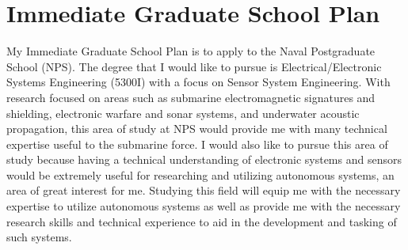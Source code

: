 \documentclass[10pt]{article}
\begin{document}
\section{Immediate Graduate School Plan}
My Immediate Graduate School Plan is to apply to the Naval Postgraduate School (NPS). The degree that I would like to pursue is Electrical/Electronic Systems Engineering (5300I) with a focus on  Sensor System Engineering. With research focused on areas such as submarine electromagnetic signatures and shielding, electronic warfare and sonar systems, and underwater acoustic propagation, this area of study at NPS would provide me with many technical expertise useful to the submarine force. I would also like to pursue this area of study because having a technical understanding of electronic systems and sensors would be extremely useful for researching and utilizing autonomous systems, an area of great interest for me. Studying this field will equip me with the necessary expertise to utilize autonomous systems as well as provide me with the necessary research skills and technical experience to aid in the development and tasking of such systems.
\end{document}
